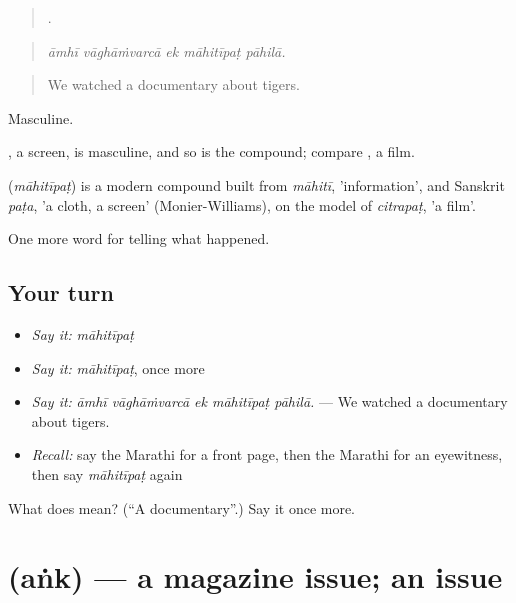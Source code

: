 \begin{quote}
    .
\end{quote}

\begin{quote}
\emph{āmhī vāghāṁvarcā ek māhitīpaṭ pāhilā.}
\end{quote}

\begin{quote}
We watched a documentary about tigers.
\end{quote}

Masculine.

, a screen, is masculine, and so is the compound; compare , a film.

\begin{cousinweb}
\textbf{} (\emph{māhitīpaṭ}) is a modern compound built from \emph{māhitī}, 'information', and Sanskrit \emph{paṭa}, 'a cloth, a screen' (Monier-Williams), on the model of \emph{citrapaṭ}, 'a film'.
\end{cousinweb}

\begin{grammarlens}[title={What you've built}]
One more word for telling what happened.
\end{grammarlens}

\subsection*{Your turn}
\begin{itemize}
\raggedright
  \item \emph{Say it:} \emph{māhitīpaṭ}
  \item \emph{Say it:} \emph{māhitīpaṭ}, once more
  \item \emph{Say it:} \emph{āmhī vāghāṁvarcā ek māhitīpaṭ pāhilā.} — We watched a documentary about tigers.
  \item \emph{Recall:} say the Marathi for a front page, then the Marathi for an eyewitness, then say \emph{māhitīpaṭ} again
\end{itemize}

\begin{tcolorbox}[breakable,colback=teal!4,colframe=teal!35!black,title={Before you move on}]
What does  mean? (\textquotedblleft{}A documentary\textquotedblright{}.) Say it once more.
\end{tcolorbox}
\section[\texorpdfstring{\mr{अंक} (aṅk)}{अंक (aṅk)}]{ (aṅk) — a magazine issue; an issue}

